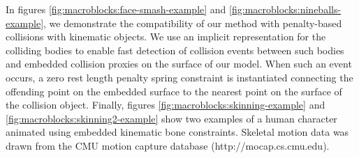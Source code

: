 In figures \ref{fig:macroblocks:face-smash-example} and
\ref{fig:macroblocks:nineballs-example}, we demonstrate the compatibility of our
method with penalty-based collisions with kinematic objects. We use an
implicit representation for the colliding bodies to enable fast
detection of collision events between such bodies and embedded
collision proxies on the surface of our model. When such an event
occurs, a zero rest length penalty spring constraint is instantiated
connecting the offending point on the embedded surface to the nearest
point on the surface of the collision
object. %
Finally, figures \ref{fig:macroblocks:skinning-example} and
\ref{fig:macroblocks:skinning2-example} show two examples of a human character
animated using embedded kinematic bone constraints. Skeletal motion
data was drawn from the CMU motion capture database
(\textsf{http://mocap.cs.cmu.edu}).

